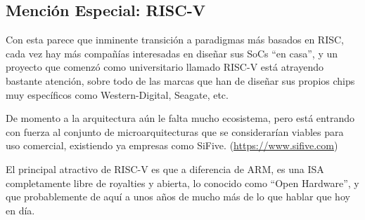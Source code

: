 \documentclass[a4paper,openright,12pt]{article}
\begin{document}
\subsection{Mención Especial: RISC-V}
Con esta parece que inminente transición a paradigmas más basados en RISC, cada vez hay más compañías interesadas en diseñar sus SoCs ``en casa'', y un proyecto que comenzó como universitario
llamado RISC-V está atrayendo bastante atención, sobre todo de las marcas que han de diseñar sus propios chips muy específicos como Western-Digital, Seagate, etc.

De momento a la arquitectura aún le falta mucho ecosistema, pero está entrando con fuerza al conjunto de microarquitecturas que se considerarían viables para uso comercial, existiendo ya
empresas como SiFive. (\url{https://www.sifive.com})

\bigskip

El principal atractivo de RISC-V es que a diferencia de ARM, es una ISA completamente libre de royalties y abierta, lo conocido como ``Open Hardware'', y que probablemente de aquí a unos
años de mucho más de lo que hablar que hoy en día.


\clearpage
\begin{flushleft}
\printbibliography[]{}
\end{flushleft}
\end{document}
